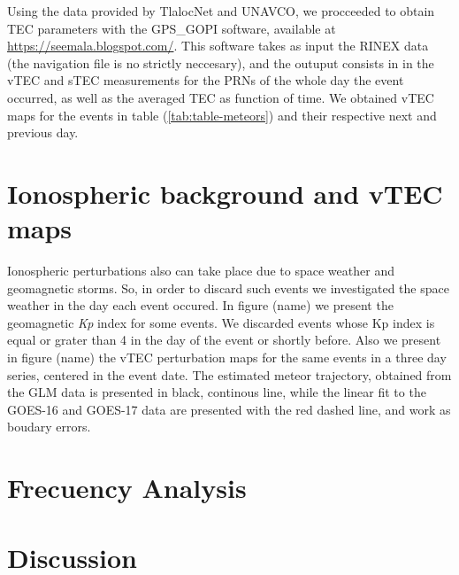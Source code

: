 \documentclass[times,twocolumn,final,authoryear]{elsarticle}
\begin{document}
Using the data provided by TlalocNet and UNAVCO, we procceeded to obtain TEC parameters with the GPS\_GOPI software, available at \url{https://seemala.blogspot.com/}. This software takes as input the RINEX data (the navigation file is no strictly neccesary), and the outuput consists in in the vTEC and sTEC measurements for the PRNs of the whole day the event occurred, as well as the averaged TEC as function of time. We obtained vTEC maps for the events in table (\ref{tab:table-meteors}) and their respective next and previous day.


\section{Ionospheric background and vTEC maps}

Ionospheric perturbations also can take place due to space weather and geomagnetic storms. So, in order to discard such events we investigated the space weather in the day each event occured. In figure (name) we present the geomagnetic \textit{Kp} index for some events. We discarded events whose Kp index is equal or grater than 4 in the day of the event or shortly before. Also we present in figure (name) the vTEC perturbation maps for the same events in a three day series, centered in the event date. The estimated meteor trajectory, obtained from the GLM data is presented in black, continous line, while the linear fit to the GOES-16 and GOES-17 data are presented with the red dashed line, and work as boudary errors.


\section{Frecuency Analysis}

\section{Discussion}

\end{document}
